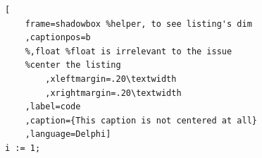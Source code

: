 \documentclass[]{scrbook}
\begin{document}
\begin{lstlisting}[
	frame=shadowbox %helper, to see listing's dim
	,captionpos=b
	%,float %float is irrelevant to the issue
	%center the listing
		,xleftmargin=.20\textwidth
		,xrightmargin=.20\textwidth
	,label=code
	,caption={This caption is not centered at all}
	,language=Delphi]
i := 1;
\end{lstlisting}
\end{document}
